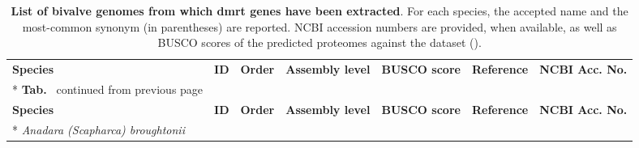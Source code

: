 \begin{landscape}
	\footnotesize
	\begin{longtable}[c]{@{}lllllll@{}}
		\caption[\textbf{List of bivalve genomes from which \gls{dmrt} genes have been extracted}]
		{
			\textbf{List of bivalve genomes from which \gls{dmrt} genes have been extracted}. For each species, the accepted name and the most-common synonym (in parentheses) are reported. NCBI accession numbers are provided, when available, as well as BUSCO scores of the predicted proteomes against the  dataset ().
		}
		\label{tab:genomes}                                                                               \\
		\toprule
		\textbf{Species}                                                                                &
		\textbf{ID}                                                                                     &
		\textbf{Order}                                                                                  &
		\textbf{Assembly level}                                                                         &
		\textbf{BUSCO score}                                                                            &
		\textbf{Reference}                                                                              &
		\textbf{NCBI Acc. No.}                                                                            \\* \hline \hline
		\endfirsthead
		\multicolumn{7}{c}%
		{\textbf{Tab. \thetable}\ continued from previous page}                                           \\
		\toprule
		\textbf{Species}                                                                                &
		\textbf{ID}                                                                                     &
		\textbf{Order}                                                                                  &
		\textbf{Assembly level}                                                                         &
		\textbf{BUSCO score}                                                                            &
		\textbf{Reference}                                                                              &
		\textbf{NCBI Acc. No.}                                                                            \\* \hline \hline
		\endhead
		\endfoot
		\endlastfoot
		\textit{Anadara (Scapharca) broughtonii}                                                        &

\end{longtable}
\end{landscape}
